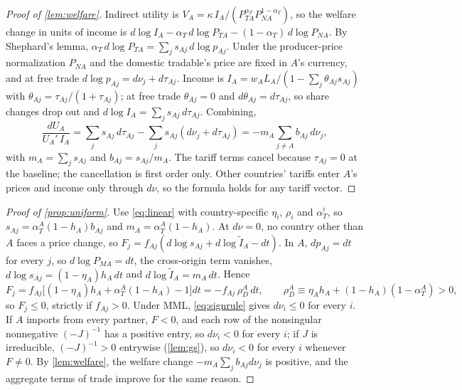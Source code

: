 \begin{proof}[Proof of \cref{lem:welfare}]
Indirect utility is $V_A=\kappa\,I_A/(P_{TA}^{\alpha_T}P_{NA}^{1-\alpha_T})$, so the welfare change in units of income is $d\log I_A-\alpha_T\,d\log P_{TA}-(1-\alpha_T)\,d\log P_{NA}$. By Shephard's lemma, $\alpha_T\,d\log P_{TA}=\sum_js_{Aj}\,d\log p_{Aj}$. Under the producer-price normalization $P_{NA}$ and the domestic tradable's price are fixed in $A$'s currency, and at free trade $d\log p_{Aj}=d\nu_j+d\tau_{Aj}$. Income is $I_A=w_AL_A/(1-\sum_j\theta_{Aj}s_{Aj})$ with $\theta_{Aj}=\tau_{Aj}/(1+\tau_{Aj})$; at free trade $\theta_{Aj}=0$ and $d\theta_{Aj}=d\tau_{Aj}$, so share changes drop out and $d\log I_A=\sum_js_{Aj}\,d\tau_{Aj}$. Combining,
\begin{equation*}
\frac{dU_A}{U_A'\,I_A}=\sum_js_{Aj}\,d\tau_{Aj}-\sum_js_{Aj}(d\nu_j+d\tau_{Aj})=-m_A\sum_{j\neq A}b_{Aj}\,d\nu_j,
\end{equation*}
with $m_A=\sum_js_{Aj}$ and $b_{Aj}=s_{Aj}/m_A$. The tariff terms cancel because $\tau_{Aj}=0$ at the baseline; the cancellation is first order only. Other countries' tariffs enter $A$'s prices and income only through $d\nu$, so the formula holds for any tariff vector.
\end{proof}

\begin{proof}[Proof of \cref{prop:uniform}]
Use \cref{eq:linear} with country-specific $\eta_i$, $\rho_i$ and $\alpha_T^i$, so $s_{Aj}=\alpha_T^A(1-h_A)b_{Aj}$ and $m_A=\alpha_T^A(1-h_A)$. At $d\nu=0$, no country other than $A$ faces a price change, so $F_j=f_{Aj}(d\log s_{Aj}+d\log\tilde I_A-dt)$. In $A$, $dp_{Aj}=dt$ for every $j$, so $d\log P_{MA}=dt$, the cross-origin term vanishes, $d\log s_{Aj}=(1-\eta_A)h_A\,dt$ and $d\log\tilde I_A=m_A\,dt$. Hence
\begin{equation*}
F_j=f_{Aj}\big[(1-\eta_A)h_A+\alpha_T^A(1-h_A)-1\big]dt=-f_{Aj}\,\rho_D^A\,dt,\qquad \rho_D^A\equiv\eta_Ah_A+(1-h_A)(1-\alpha_T^A)>0,
\end{equation*}
so $F_j\leq0$, strictly if $f_{Aj}>0$. Under MML, \cref{eq:signrule} gives $d\nu_i\leq0$ for every $i$. If $A$ imports from every partner, $F<0$, and each row of the nonsingular nonnegative $(-J)^{-1}$ has a positive entry, so $d\nu_i<0$ for every $i$; if $J$ is irreducible, $(-J)^{-1}>0$ entrywise (\cref{lem:gs}), so $d\nu_i<0$ for every $i$ whenever $F\neq0$. By \cref{lem:welfare}, the welfare change $-m_A\sum_jb_{Aj}d\nu_j$ is positive, and the aggregate terms of trade improve for the same reason.
\end{proof}

